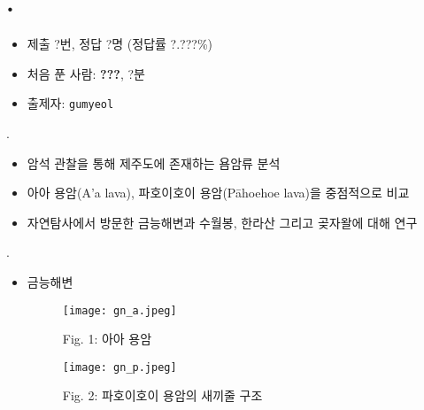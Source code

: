 \section{\probidx. \probname}

\begin{frame} %
	\sectiontitle{\probidx}{\probname}
	\begin{itemize}
		\item 제출 ?번, 정답 ?명 (정답률 ?.???\%)
		\item 처음 푼 사람: \textbf{???}, ?분
		\item 출제자: \texttt{gumyeol}
	\end{itemize}
\end{frame}

\begin{frame}{\textbf{\probidx}. \probname}
	\begin{itemize}
		\item 암석 관찰을 통해 제주도에 존재하는 욤암류 분석
		\item 아아 용암(A'a lava), 파호이호이 용암(Pāhoehoe lava)을 중점적으로 비교
		\item 자연탐사에서 방문한 금능해변과 수월봉, 한라산 그리고 곶자왈에 대해 연구
	\end{itemize}
\end{frame}


\begin{frame}{\textbf{\probidx}. \probname}
	\begin{itemize}
		\vspace{1em}
		\item 금능해변

		      \vspace{1em}
		      \begin{minipage}{.25\textwidth}
			      \begin{center}
				      \begin{figure}[bh]
					      \centering
					      \texttt{[image: gn\_a.jpeg]}
					      \caption{Fig. 1: 아아 용암}
				      \end{figure}
			      \end{center}
		      \end{minipage}
		      \begin{minipage}{.1\textwidth}
		      \end{minipage}
		      \begin{minipage}{.25\textwidth}
			      \begin{center}
				      \begin{figure}[bh]
					      \centering
					      \texttt{[image: gn\_p.jpeg]}
					      \caption{Fig. 2: 파호이호이 용암의 새끼줄 구조}
				      \end{figure}
			      \end{center}
		      \end{minipage}
	\end{itemize}
\end{frame}
